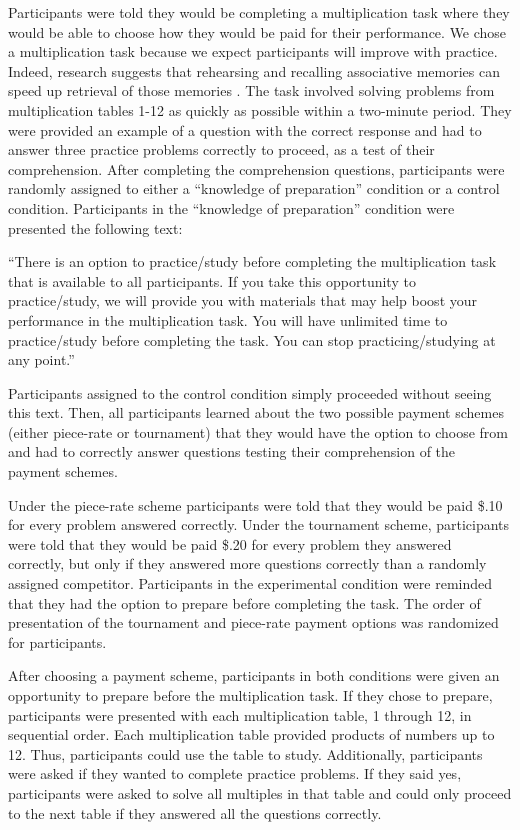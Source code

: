 \documentclass[a4paper, nobind]{templates/ociamthesis}
\begin{document}
Participants were told they would be completing a multiplication task where they would be able to choose how they would be paid for their performance. We chose a multiplication task because we expect participants will improve with practice. Indeed, research suggests that rehearsing and recalling associative memories can speed up retrieval of those memories \autocite{Rundus1971}. The task involved solving problems from multiplication tables 1-12 as quickly as possible within a two-minute period. They were provided an example of a question with the correct response and had to answer three practice problems correctly to proceed, as a test of their comprehension. After completing the comprehension questions, participants were randomly assigned to either a ``knowledge of preparation'' condition or a control condition. Participants in the ``knowledge of preparation'' condition were presented the following text:

``There is an option to practice/study before completing the multiplication task that is available to all participants. If you take this opportunity to practice/study, we will provide you with materials that may help boost your performance in the multiplication task. You will have unlimited time to practice/study before completing the task. You can stop practicing/studying at any point.''

Participants assigned to the control condition simply proceeded without seeing this text. Then, all participants learned about the two possible payment schemes (either piece-rate or tournament) that they would have the option to choose from and had to correctly answer questions testing their comprehension of the payment schemes.

Under the piece-rate scheme participants were told that they would be paid \$.10 for every problem answered correctly. Under the tournament scheme, participants were told that they would be paid \$.20 for every problem they answered correctly, but only if they answered more questions correctly than a randomly assigned competitor. Participants in the experimental condition were reminded that they had the option to prepare before completing the task. The order of presentation of the tournament and piece-rate payment options was randomized for participants.

After choosing a payment scheme, participants in both conditions were given an opportunity to prepare before the multiplication task. If they chose to prepare, participants were presented with each multiplication table, 1 through 12, in sequential order. Each multiplication table provided products of numbers up to 12. Thus, participants could use the table to study. Additionally, participants were asked if they wanted to complete practice problems. If they said yes, participants were asked to solve all multiples in that table and could only proceed to the next table if they answered all the questions correctly.
\end{document}
